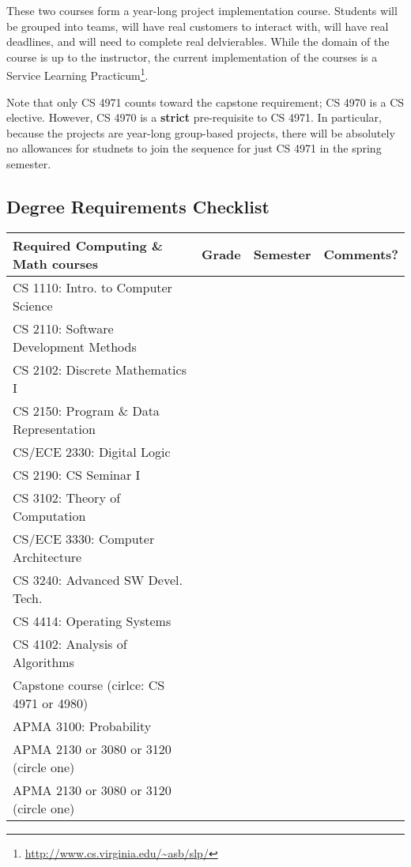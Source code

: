 \documentclass[10pt,letter]{book}
\newcommand{\myurl}[1]{\footnote{\scriptsize\url{#1}}}
\begin{document}
These two courses form a year-long project implementation course.
Students will be grouped into teams, will have real customers to
interact with, will have real deadlines, and will need to complete
real delvierables.  While the domain of the course is up to the
instructor, the current implementation of the courses is a Service
Learning Practicum\myurl{http://www.cs.virginia.edu/~asb/slp/}.

Note that only CS 4971 counts toward the capstone requirement; CS 4970
is a CS elective.  However, CS 4970 is a {\bf strict} pre-requisite to
CS 4971.  In particular, because the projects are year-long
group-based projects, there will be absolutely no allowances for
studnets to join the sequence for just CS 4971 in the spring semester.



\clearpage
\subsection{Degree Requirements Checklist}

\small 
\begin{tabular}{|l|l|l|l|} \hline
\bf Required Computing \& Math courses & \bf Grade & \bf Semester &
\bf Comments? \\ \hline \hline
CS 1110: Intro. to Computer Science & & & \\ \hline
CS 2110: Software Development Methods & & & \\ \hline
CS 2102: Discrete Mathematics I & & & \\ \hline
CS 2150: Program \& Data Representation & & & \\ \hline
CS/ECE 2330: Digital Logic & & & \\ \hline
CS 2190: CS Seminar I & & & \\ \hline
CS 3102: Theory of Computation & & & \\ \hline
CS/ECE 3330: Computer Architecture & & & \\ \hline
CS 3240: Advanced SW Devel. Tech. & & & \\ \hline
CS 4414: Operating Systems & & & \\ \hline
CS 4102: Analysis of Algorithms & & & \\ \hline
Capstone course (cirlce: CS 4971 or 4980) & & & \\ \hline
APMA 3100: Probability & & & \\ \hline
APMA 2130 or 3080 or 3120 (circle one) & & & \\ \hline
APMA 2130 or 3080 or 3120 (circle one) & & & \\ \hline
\end{tabular}
\end{document}

